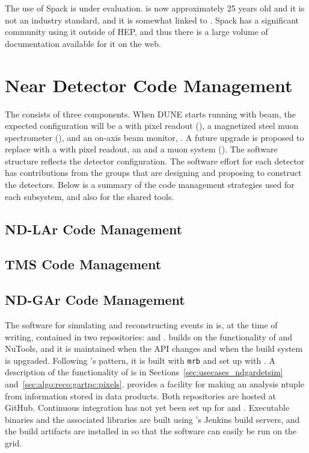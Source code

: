 \documentclass[../main-v1.tex]{subfiles}
\begin{document}
The use of Spack is under evaluation.   is now approximately 25 years old and it is not an industry standard, and it is somewhat linked to .  Spack has a significant community using it outside of HEP, and thus there is a large volume of documentation available for it on the web.

\section{Near Detector Code Management }
\label{sec:codemgmt:neardet}  %

The  consists of three components.  When DUNE starts running with beam, the expected  configuration will be a  with pixel readout (), a magnetized steel muon spectrometer (), and an on-axis beam monitor, .  A future upgrade is proposed to replace  with a  with pixel readout, an  and a muon system (). The software structure reflects the detector configuration.  The software effort for each detector has contributions from the groups that are designing and proposing to construct the detectors.  Below is a summary of the code management strategies used for each subsystem, and also for the shared tools.

\subsection{ND-LAr Code Management}
\label{sec:codemgmt:ndlar}

\subsection{TMS Code Management}
\label{sec:codemgmt:tms}

\subsection{ND-GAr Code Management}
\label{sec:codemgmt:ndgar}

The software for simulating and reconstructing events in  is, at the time of writing, contained in two repositories:   and .   builds on the functionality of  and NuTools, and it is maintained when the  API changes and when the build system is upgraded.  Following 's pattern, it is built with {\tt mrb} and set up with .   A description of the functionality of  is in Sections~\ref{sec:usecases_ndgardetsim} and~\ref{sec:algo:reco:gartpc:pixels}.   provides a facility for making an analysis ntuple from information stored in  data products.  Both repositories are hosted at GitHub.  Continuous integration has not yet been set up for  and .  Executable binaries and the associated libraries are built using 's Jenkins build servers, and the build artifacts are installed in  so that the software can easily be run on the grid.
\end{document}
